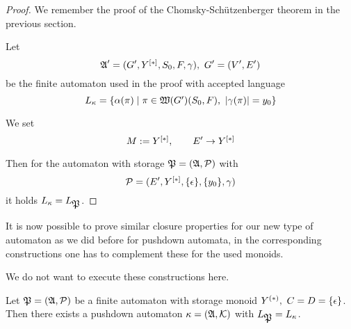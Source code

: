 \begin{proof}
We remember the proof of the Chomsky-Schützenberger theorem in the previous
section.

Let
\[ \mbox{$\mathfrak{A}$}'=(G', \mbox{${Y}^{[*]}$}, S_0, F, \gamma),\ G'=(V',E') \]
be the finite automaton used in the proof with accepted language
\[ L_\kappa = \mbox{$\{\alpha(\pi) \mid \pi \in \mbox{$\mathfrak{W}({G'})$}(S_0,F),\
|\gamma(\pi)|=y_0\}$} \]

We set
\[ M := \mbox{${Y}^{[*]}$},\qquad E' \to \mbox{${Y}^{[*]}$} \]

Then for the automaton with storage $\mbox{$\mathfrak{P}$}=(\mbox{$\mathfrak{A}$}, \mbox{$\mathcal{P}$})$ with 
\[ \mbox{$\mathcal{P}$} = (E', \mbox{${Y}^{[*]}$}, \mbox{$\{\epsilon\}$}, \mbox{$\{y_0\}$}, \gamma) \]
it holds $L_\kappa = L_{\mbox{$\mathfrak{P}$}}$.
\end{proof}

\bigskip
It is now possible to prove similar closure properties for our new type of
automaton as we did before for pushdown automata, in the corresponding
constructions one has to complement these for the used monoids.

We do not want to execute these constructions here.

\bigskip
\begin{theorem}[]
Let $\mbox{$\mathfrak{P}$}=(\mbox{$\mathfrak{A}$}, \mbox{$\mathcal{P}$})$ be a finite automaton with storage monoid
$\mbox{${Y}^{(*)}$},\ C = D = \mbox{$\{\epsilon\}$}$. Then there exists a pushdown automaton
$\kappa = (\mbox{$\mathfrak{A}$}, \mbox{$\mathcal{K}$})$ with $L_{\mbox{$\mathfrak{P}$}} = L_\kappa$.
\end{theorem}

